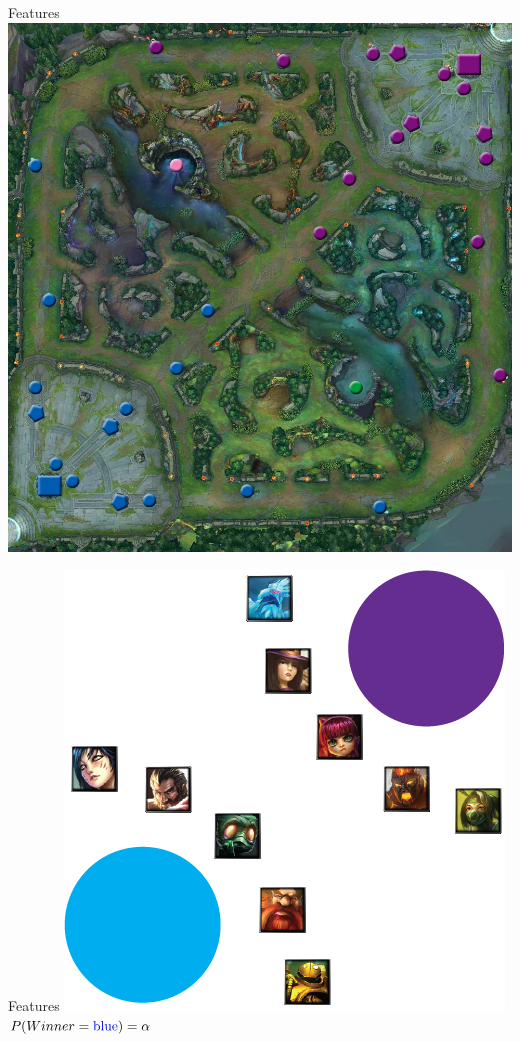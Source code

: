 \begin{frame}{Features}
\centering
\includegraphics[scale=0.2]{img/kent/lolmap.jpg}
\end{frame}

\begin{frame}{Features}
\centering
\includegraphics[scale=0.35]{img/kent/1.png}\\
\vspace{8pt}
$P(Winner = \textcolor{blue}{\text{blue}}) = \alpha$
\end{frame}

